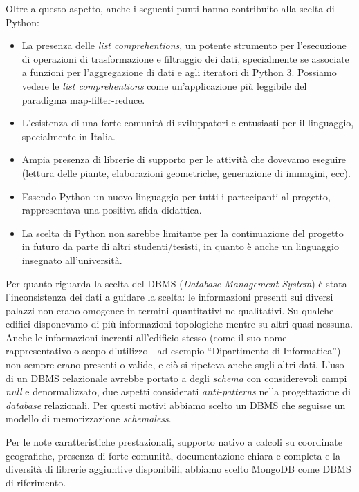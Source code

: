 \documentclass[12pt]{report}
\begin{document}
Oltre a questo aspetto, anche i seguenti punti hanno contribuito alla scelta di Python:
\begin{itemize}
  \item La presenza delle \textit{list comprehentions}, un potente strumento per l'esecuzione di operazioni di trasformazione e filtraggio dei dati, specialmente se associate a funzioni per l'aggregazione di dati e agli iteratori di Python 3. Possiamo vedere le \textit{list comprehentions} come un'applicazione più leggibile del paradigma map-filter-reduce.
  \item L'esistenza di una forte comunità di sviluppatori e entusiasti per il linguaggio, specialmente in Italia.
  \item Ampia presenza di librerie di supporto per le attività che dovevamo eseguire (lettura delle piante, elaborazioni geometriche, generazione di immagini, ecc).
  \item Essendo Python un nuovo linguaggio per tutti i partecipanti al progetto, rappresentava una positiva sfida didattica.
  \item La scelta di Python non sarebbe limitante per la continuazione del progetto in futuro da parte di altri studenti/tesisti, in quanto è anche un linguaggio insegnato all'università.
\end{itemize}

Per quanto riguarda la scelta del DBMS (\textit{Database Management System}) è stata l'inconsistenza dei dati a guidare la scelta: le informazioni presenti sui diversi palazzi non erano omogenee in termini quantitativi ne qualitativi. Su qualche edifici disponevamo di più informazioni topologiche mentre su altri quasi nessuna. Anche le informazioni inerenti all'edificio stesso (come il suo nome rappresentativo o scopo d'utilizzo - ad esempio ``Dipartimento di Informatica'') non sempre erano presenti o valide, e ciò si ripeteva anche sugli altri dati. L'uso di un DBMS relazionale avrebbe portato a degli \textit{schema} con considerevoli campi \textit{null} e denormalizzato, due aspetti considerati \textit{anti-patterns} nella progettazione di \textit{database} relazionali. Per questi motivi abbiamo scelto un DBMS che seguisse un modello di memorizzazione \textit{schemaless}. 

Per le note caratteristiche prestazionali, supporto nativo a calcoli su coordinate geografiche, presenza di forte comunità, documentazione chiara e completa e la diversità di librerie aggiuntive disponibili, abbiamo scelto MongoDB come DBMS di riferimento.
\end{document}
